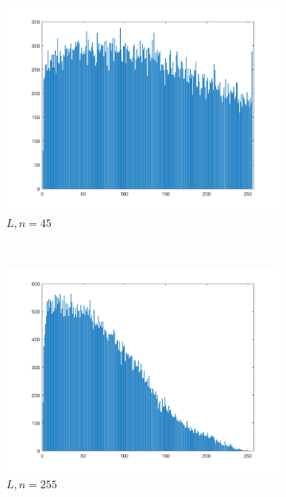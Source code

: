 \documentclass{article}
\begin{document}
\begin{enumerate}[label=(\alph*)]
\begin{figure}[!htb]
        \begin{subfigure}[b]{0.3\textwidth}
            \includegraphics[width=\textwidth]{img/hist_L45.png}
            \caption{$L, n = 45$}
        \end{subfigure}
        ~
        \begin{subfigure}[b]{0.3\textwidth}
            \includegraphics[width=\textwidth]{img/hist_L255.png}
            \caption{$L, n = 255$}
        \end{subfigure}
        ~
        \begin{subfigure}[b]{0.3\textwidth}

\end{subfigure}
\end{figure}
\end{enumerate}
\end{document}
